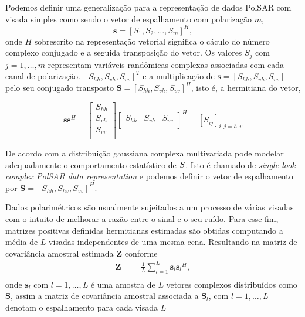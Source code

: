 \documentclass[remotesensing,article,submit,moreauthors,pdftex]{Definitions/mdpi}
\begin{document}
Podemos definir uma generalização para a representação de dados PolSAR com visada simples como sendo o vetor de espalhamento com polarização $m$, $$\mathbf{s}=[S_1,S_2,\dots,S_m]^H,$$ onde $H$ sobrescrito na representação vetorial significa o cáculo do número complexo conjugado e a seguida transposição do vetor. Os valores $S_j$ com $j=1,\dots,m$ representam variáveis randômicas complexas associadas com cada canal de polarização. $[S_{hh},S_{vh},S_{vv}]^T$ e a multiplicação de $\mathbf{s}=[S_{hh},S_{vh},S_{vv}]$ pelo seu conjugado transposto $\mathbf{S}=[S_{hh},S_{vh},S_{vv}]^H$, isto é, a hermitiana do vetor, 

\begin{equation}
\mathbf{s}\mathbf{s}^H = \left[
\begin{array}{c}
	S_{hh}      \\
        S_{vh}     \\
	S_{vv}      \\
\end{array}
\right]
\left[
\begin{array}{ccc}
	S_{hh}  & S_{vh}  & S_{vv}      \\
\end{array}
\right]^H = \left[S_{ij} \right]_{i,j=h,v}
\end{equation}

De acordo com \cite{good} a distribuição gaussiana complexa multivariada pode modelar adequadamente o comportamento estatístico de $\boldmath S$. Isto é chamado de {\it single-look complex PolSAR data representation} e podemos definir o vetor de espalhamento por $\mathbf{S}=[S_{hh},S_{hv},S_{vv}]^H$. 

Dados polarimétricos são usualmente sujeitados a um processo de várias visadas com o intuito de melhorar a razão entre o sinal e o seu ruído. Para esse fim, matrizes positivas definidas hermitianas estimadas são obtidas computando a média de $L$ visadas independentes de uma mesma cena. Resultando na matriz de covariância amostral estimada {\bf Z} conforme \cite{good, ade}
\begin{equation}
\begin{array}{ccc}
    \mathbf{Z}&=&\frac{1}{L}\displaystyle{\sum_{l=1}^{L} {\mathbf{s}_l}{\mathbf{s}_l}^H}, \\
\end{array}
\end{equation}
onde $\mathbf{s}_l$ com $l = 1, \dots, L$ é uma amostra de $\mathit{L}$ vetores complexos distribuídos como $\mathbf{S}$, assim a matriz de covariância amostral associada a $\mathbf{S}_l$, com $l=1,\dots,L$ denotam o espalhamento para cada visada $L$ 
\end{document}
